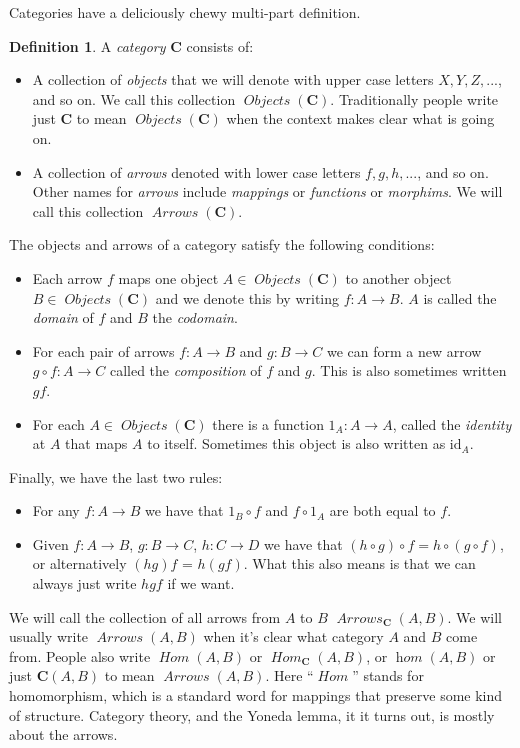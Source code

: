 \documentclass[12pt]{article}
\theoremstyle{definition}
\theoremstyle{definition}
\newtheorem{defn}{Definition}[]
\theoremstyle{definition}
\numberwithin{equation}{section}
\newcommand{\cat}[1]{\mathbf{#1}}      %
\newcommand{\id}{\mathrm{id}} %
\newcommand{\CC}{\cat{C}}
\DeclareMathOperator{\Arrows}{\mathit{Arrows}}
\DeclareMathOperator{\Objects}{\mathit{Objects}}
\DeclareMathOperator{\Hom}{\mathit{Hom}}
\DeclareMathOperator{\ihom}{\mathit{hom}}
\def\objc{\Objects(\cat{C})}
\def\ni{\goodbreak\noindent}
\begin{document}
Categories have a deliciously chewy multi-part definition.

\begin{defn}
\label{category}
A {\it category} $\CC$ consists of:
%
\begin{itemize}
\item 
A collection of {\it objects} that we will denote with upper case letters $X, Y, Z, ...$,
and so on.  
We call this collection $\objc$. Traditionally people write just $\CC$ to mean $\objc$
when the context makes clear what is going on.
\item
A collection of {\it arrows} denoted with lower case letters $f, g, h, ...$, and so on.
Other names for {\it arrows} include {\it mappings} or {\it functions} or {\it morphims}.
We will call this collection $\Arrows(\CC)$. \end{itemize}%
The objects and arrows of a category satisfy the following conditions:
\begin{itemize}
\item
Each arrow $f$ maps one object $A \in \objc$ to another object $B \in \objc$ and we denote
this by writing $f: A \to B$. $A$ is called the {\it domain} of $f$ and $B$ the {\it
codomain}.
\item
For each pair of arrows $f:A \to B$ and $g : B \to C$ we can form a new arrow $g \circ f:
A \to C$ called the {\it composition} of $f$ and $g$. This is also sometimes written $gf$.
\item
For each $A \in \objc$ there is a function $1_A: A \to A$, called the {\it identity} at
$A$ that maps $A$ to itself. Sometimes this object is also written as $\id_A$.
\end{itemize}
\goodbreak\ni Finally, we have the last two rules:

\begin{itemize}
\item For any $f: A \to B$ we have that $1_B \circ f$ and $f \circ 1_A$ are both equal to
$f$. 
\item Given $f: A \to B$, $g: B \to C$, $h: C\to D$ we have that $(h \circ g) \circ f = h
\circ (g \circ f)$, or alternatively $(hg)f$ = $h(gf)$. What this also means is that we
can always just write $hgf$ if we want. \end{itemize}%
\end{defn}%
\ni
We will call the collection of all arrows from $A$ to $B$ $\Arrows_{\CC}(A, B)$. We will
usually write $\Arrows(A,B)$ when it's clear what category $A$ and $B$ come from. People
also write $\Hom(A, B)$ or $\Hom_{\CC}(A,B)$, or $\ihom(A, B)$ or just $\CC(A,B)$ to mean
$\Arrows(A,B)$. Here ``$\Hom$'' stands for homomorphism, which is a standard word for
mappings that preserve some kind of structure. Category theory, and the Yoneda lemma, it
it turns out, is mostly about the arrows.
\end{document}

